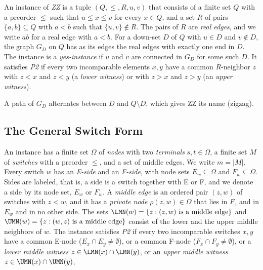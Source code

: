 \begin{definition}[ZZ and P2]
\label{def:zz-zz}
An instance of \emph{ZZ} is a tuple $(Q, \leq, R, u, v)$ that consists of a finite set $Q$ with a preorder $\leq$ such that $u \leq x \leq v$ for every $x \in Q$, and a set $R$ of pairs $\{a, b\} \subseteq Q$ with $a < b$ such that $\{u, v\} \notin R$.
The pairs of $R$ are \emph{real edges}, and we write $ab$ for a real edge with $a < b$.
For a down-set $D$ of $Q$ with $u \in D$ and $v \notin D$, the graph $G_D$ on $Q$ has as its edges the real edges with exactly one end in $D$.
The instance is a \emph{yes-instance} if $u$ and $v$ are connected in $G_D$ for some such $D$.
It satisfies \emph{P2} if every two incomparable elements $x, y$ have a common $R$-neighbor $z$ with $z < x$ and $z < y$ (a \emph{lower witness}) or with $z > x$ and $z > y$ (an \emph{upper witness}).
\end{definition}

A path of $G_D$ alternates between $D$ and $Q \setminus D$, which gives ZZ its name (zigzag).

\subsection{The General Switch Form}
\label{sec:zz-switch-form}

\begin{definition}
\label{def:zz-general}
An instance has a finite set $\Omega$ of \emph{nodes} with two \emph{terminals} $s, t \in \Omega$, a finite set $M$ of \emph{switches} with a preorder $\leq$, and a set of middle edges.
We write $m = |M|$.
Every switch $w$ has an \emph{E-side} and an \emph{F-side}, with node sets $E_w \subseteq \Omega$ and $F_w \subseteq \Omega$.
Sides are labeled, that is, a side is a switch together with E or F, and we denote a side by its node set, $E_w$ or $F_w$.
A \emph{middle edge} is an ordered pair $(z, w)$ of switches with $z < w$, and it has a \emph{private node} $\rho(z, w) \in \Omega$ that lies in $F_z$ and in $E_w$ and in no other side.
The sets $\LMN(w) = \{z : (z, w) \text{ is a middle edge}\}$ and $\UMN(w) = \{z : (w, z) \text{ is a middle edge}\}$ consist of the lower and the upper middle neighbors of $w$.
The instance satisfies \emph{P2} if every two incomparable switches $x, y$ have a common E-node ($E_x \cap E_y \neq \emptyset$), or a common F-node ($F_x \cap F_y \neq \emptyset$), or a \emph{lower middle witness} $z \in \LMN(x) \cap \LMN(y)$, or an \emph{upper middle witness} $z \in \UMN(x) \cap \UMN(y)$.
\end{definition}


